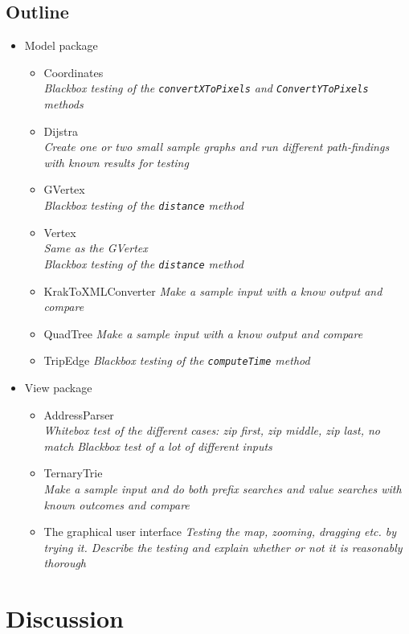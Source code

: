 \documentclass[a4paper,11pt]{article}
\begin{document}
\subsection{Outline}
\begin{itemize}
	\item Model package
	\begin{itemize}
		\item Coordinates \\
			\textsl{Blackbox testing of the \texttt{convertXToPixels} and \texttt{ConvertYToPixels} methods}
		\item Dijstra \\
			\textsl{Create one or two small sample graphs and run different path-findings with known results for testing}
		\item GVertex \\
			\textsl{Blackbox testing of the \texttt{distance} method}
		\item Vertex \\
			\textsl{Same as the GVertex \\Blackbox testing of the \texttt{distance} method}
		\item KrakToXMLConverter
			\textsl{Make a sample input with a know output and compare}
		\item QuadTree
			\textsl{Make a sample input with a know output and compare}
		\item TripEdge
			\textsl{Blackbox testing of the \texttt{computeTime} method}
	\end{itemize}
	\item View package
	\begin{itemize}
		\item AddressParser \\
			\textsl{Whitebox test of the different cases: zip first, zip middle, zip last, no match}
			\textsl{Blackbox test of a lot of different inputs}
		\item TernaryTrie \\
			\textsl{Make a sample input and do both prefix searches and value searches with known outcomes and compare}
		\item The graphical user interface
			\textsl{Testing the map, zooming, dragging etc. by trying it. Describe the testing and explain whether or not it is reasonably thorough}
	\end{itemize}
\end{itemize}


\pagebreak
\section{Discussion}
\label{sec:Discussion}
\end{document}
